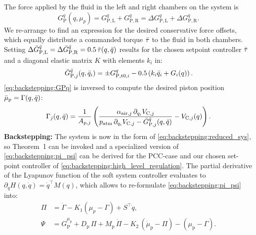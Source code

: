 The force applied by the fluid in the left and right chambers on the system is
\begin{equation}
    G_{\mathrm{P}}^q(q, \mu_p) =  G_{\mathrm{P},\mathrm{L}}^q + G_{\mathrm{P},\mathrm{R}}^q = \Delta G_{\mathrm{P},\mathrm{L}}^q + \Delta G_{\mathrm{P},\mathrm{R}}^q .
\end{equation}
We re-arrange to find an expression for the desired conservative force offsets, which equally distribute a commanded torque $\Bar{\tau}$ to the fluid in both chambers. Setting
$\Delta \Bar{G}_{\mathrm{P},\mathrm{L}}^{\Bar{q}} =  \Delta \Bar{G}_{\mathrm{P},\mathrm{R}}^{\Bar{q}} = 0.5 \, \Bar{\tau}(q, \Bar{q})$
results for the chosen setpoint controller $\Bar{\tau}$ and a diagonal elastic matrix $K$ with elements $k_i$ in:
\begin{equation}\label{eq:backstepping:dist_G_p_q_planar_pcc}
    \Bar{G}_{\mathrm{P},j}^{\Bar{q}}(q, \Bar{q}_i) 
    = \pm G_{\mathrm{P},\mathrm{t}0,i}^{q} - 0.5 \left ( k_i \Bar{q}_i + G_i(q) \right ).
\end{equation}
\eqref{eq:backstepping:GPq} is inversed to compute the desired piston position $\Bar{\mu}_{\mathrm{p}} = \Gamma(q, \Bar{q})$:
\begin{equation}\label{eq:backstepping:gamma}
    \Gamma_j(q, \Bar{q}) = \frac{1}{A_{\mathrm{p},j}} \left ( \frac{\alpha_{\mathrm{air},j} \, \partial_{q_i} V_{\mathrm{C},j}}{p_\mathrm{atm} \, \partial_{q_i} V_{\mathrm{C},j} - \Bar{G}_{\mathrm{P},j}^{\Bar{q}}(q, \Bar{q})} - V_{\mathrm{C},j}(q) \right ).
\end{equation}
\textbf{Backstepping:}
The system is now in the form of \eqref{eq:backstepping:reduced_sys}, so Theorem~1 can be invoked and a specialized version of \eqref{eq:backstepping:pi_psi} can be derived for the \gls{PCC}-case and our chosen set-point controller of \eqref{eq:backstepping:high_level_regulation}. The partial derivative of the Lyapunov function of the soft system controller evaluates to $ \partial_{\dot{q}} H(q, \dot{q}) = \dot{q}^\top M(q)$, which allows to re-formulate \eqref{eq:backstepping:pi_psi} into:
\begin{equation}
\begin{split}
    \Pi &= \dot{\Gamma} - K_1 (\mu_p - \Gamma) + S^\top \dot{q},\\
    \Psi &= G_{\mathrm{P}}^{\mu_\mathrm{p}} + D_\mathrm{p} \, \Pi + M_\mathrm{p} \, \dot{\Pi} - K_2 \, (\dot{\mu}_\mathrm{p} - \Pi) - (\mu_\mathrm{p} - \Gamma).
\end{split}
\end{equation}

